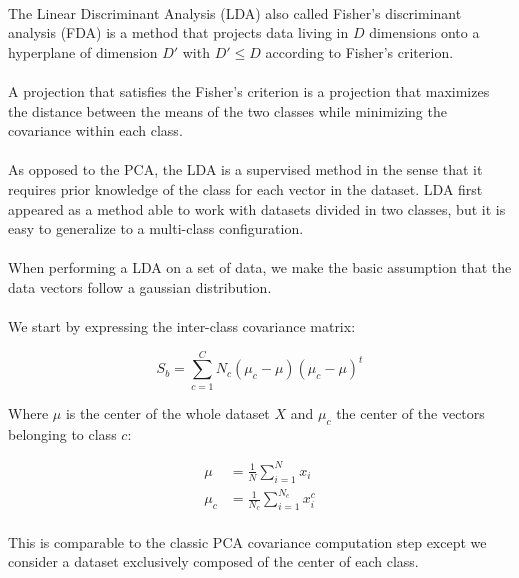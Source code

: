 
\paragraph{}
The Linear Discriminant Analysis (LDA) also called Fisher's discriminant analysis (FDA) is a method that projects data living in $D$ dimensions onto a hyperplane of dimension $D'$ with $D' \leq D$ according to Fisher's criterion. 

\paragraph{}
A projection that satisfies the Fisher's criterion is a projection that maximizes the distance between the means of the two classes while minimizing the covariance within each class.

\paragraph{}
As opposed to the PCA, the LDA is a supervised method in the sense that it requires prior knowledge of the class for each vector in the dataset. LDA first appeared as a method able to work with datasets
divided in two classes, but it is easy to generalize to a multi-class configuration.

\paragraph{}
When performing a LDA on a set of data, we make the basic assumption that the data vectors follow a gaussian distribution.

\paragraph{}
We start by expressing the inter-class covariance matrix:

\begin{equation*}
S_b = \sum_{c = 1}^C N_c(\mu_c - \mu)(\mu_c - \mu)^t
\end{equation*}

Where $\mu$ is the center of the whole dataset $X$ and $\mu_c$ the center of the vectors belonging to class $c$:

\begin{align*}
\mu &= \frac{1}{N}\sum_{i = 1}^{N} x_i \\
\mu_c &= \frac{1}{N_c}\sum_{i = 1}^{N_c} x_i^c
\end{align*}

\paragraph{}
This is comparable to the classic PCA covariance computation step except we consider a dataset
exclusively composed of the center of each class.

